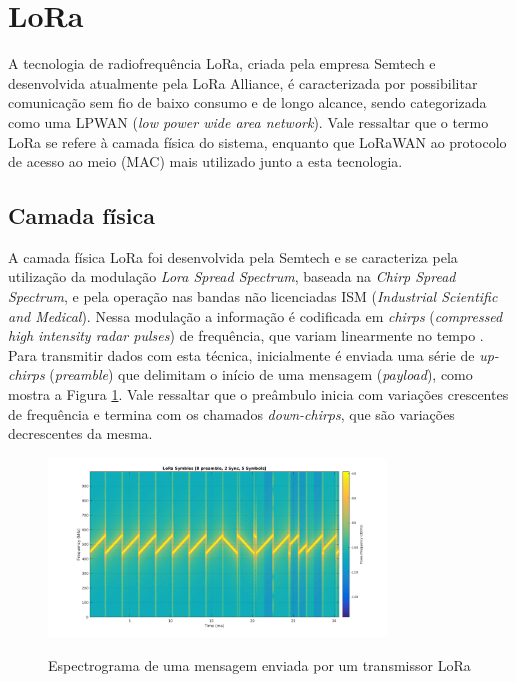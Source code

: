 \documentclass[oneside,openright,12pt]{ufsm_2015} %
\begin{document}
\section{LoRa}
A tecnologia de radiofrequência LoRa, criada pela empresa Semtech e desenvolvida atualmente pela LoRa Alliance, é caracterizada por possibilitar comunicação sem fio de baixo consumo e de longo alcance, sendo categorizada como uma LPWAN (\textit{low power wide area network}). Vale ressaltar que o termo LoRa se refere à camada física do sistema, enquanto que LoRaWAN ao protocolo de acesso ao meio (MAC) mais utilizado junto a esta tecnologia.

\subsection{Camada física}
A camada física LoRa foi desenvolvida pela Semtech e se caracteriza pela utilização da modulação \textit{Lora Spread Spectrum}, baseada na \textit{Chirp Spread Spectrum}, e pela operação nas bandas não licenciadas ISM (\textit{Industrial Scientific and Medical}). Nessa modulação a informação é codificada em \textit{chirps} (\textit{compressed high intensity radar pulses}) de frequência, que variam linearmente no tempo \cite{augustin2016study}. Para transmitir dados com esta técnica, inicialmente é enviada uma série de \textit{up-chirps} (\textit{preamble}) que delimitam o início de uma mensagem (\textit{payload}), como mostra a Figura \ref{fig:lora-message}. Vale ressaltar que o preâmbulo inicia com variações crescentes de frequência e termina com os chamados \textit{down-chirps}, que são variações decrescentes da mesma.

\begin{figure}[ht]
    \caption{\label{exepretex} Espectrograma de uma mensagem enviada por um transmissor LoRa}
    \centering
    \includegraphics[width=0.8\textwidth]{figuras/lora-symbols.png}
    \vspace{\baselineskip} %
        \label{fig:lora-message}
\end{figure}
\end{document}
